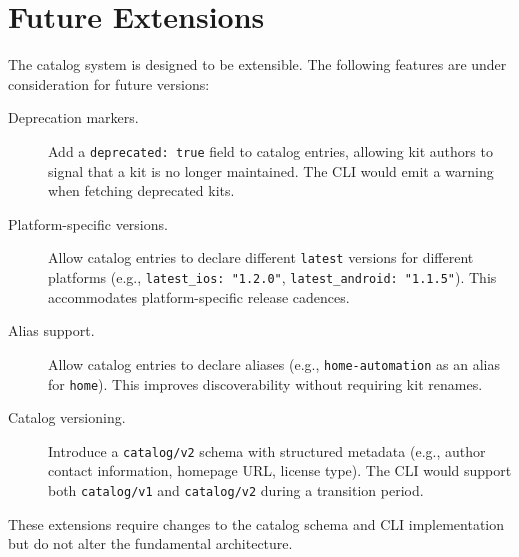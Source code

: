 \section{Future Extensions}
\label{sec:catalog-future}

The catalog system is designed to be extensible. The following features are under consideration for future versions:

\begin{description}
  \item[Deprecation markers.] Add a \texttt{deprecated: true} field to catalog entries, allowing kit authors to signal that a kit is no longer maintained. The CLI would emit a warning when fetching deprecated kits.

  \item[Platform-specific versions.] Allow catalog entries to declare different \texttt{latest} versions for different platforms (e.g., \texttt{latest\_ios: "1.2.0"}, \texttt{latest\_android: "1.1.5"}). This accommodates platform-specific release cadences.

  \item[Alias support.] Allow catalog entries to declare aliases (e.g., \texttt{home-automation} as an alias for \texttt{home}). This improves discoverability without requiring kit renames.

  \item[Catalog versioning.] Introduce a \texttt{catalog/v2} schema with structured metadata (e.g., author contact information, homepage URL, license type). The CLI would support both \texttt{catalog/v1} and \texttt{catalog/v2} during a transition period.
\end{description}

These extensions require changes to the catalog schema and CLI implementation but do not alter the fundamental architecture.
